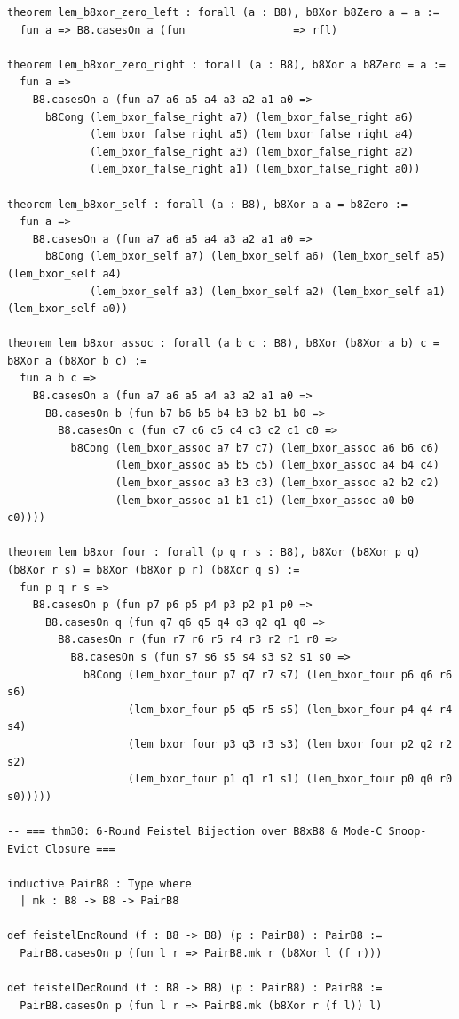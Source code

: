 \documentclass[10pt,twocolumn]{article}
\theoremstyle{spectralthm}
\begin{document}
\begin{lstlisting}[language=Lean4,caption={Standalone Pure Init.Prelude Term-Mode Lean 4 Expansion (thm30--thm37, v1.1.0, 0 sorry, 0 axioms).},label={lst:lean_v110}]
theorem lem_b8xor_zero_left : forall (a : B8), b8Xor b8Zero a = a :=
  fun a => B8.casesOn a (fun _ _ _ _ _ _ _ _ => rfl)

theorem lem_b8xor_zero_right : forall (a : B8), b8Xor a b8Zero = a :=
  fun a =>
    B8.casesOn a (fun a7 a6 a5 a4 a3 a2 a1 a0 =>
      b8Cong (lem_bxor_false_right a7) (lem_bxor_false_right a6)
             (lem_bxor_false_right a5) (lem_bxor_false_right a4)
             (lem_bxor_false_right a3) (lem_bxor_false_right a2)
             (lem_bxor_false_right a1) (lem_bxor_false_right a0))

theorem lem_b8xor_self : forall (a : B8), b8Xor a a = b8Zero :=
  fun a =>
    B8.casesOn a (fun a7 a6 a5 a4 a3 a2 a1 a0 =>
      b8Cong (lem_bxor_self a7) (lem_bxor_self a6) (lem_bxor_self a5) (lem_bxor_self a4)
             (lem_bxor_self a3) (lem_bxor_self a2) (lem_bxor_self a1) (lem_bxor_self a0))

theorem lem_b8xor_assoc : forall (a b c : B8), b8Xor (b8Xor a b) c = b8Xor a (b8Xor b c) :=
  fun a b c =>
    B8.casesOn a (fun a7 a6 a5 a4 a3 a2 a1 a0 =>
      B8.casesOn b (fun b7 b6 b5 b4 b3 b2 b1 b0 =>
        B8.casesOn c (fun c7 c6 c5 c4 c3 c2 c1 c0 =>
          b8Cong (lem_bxor_assoc a7 b7 c7) (lem_bxor_assoc a6 b6 c6)
                 (lem_bxor_assoc a5 b5 c5) (lem_bxor_assoc a4 b4 c4)
                 (lem_bxor_assoc a3 b3 c3) (lem_bxor_assoc a2 b2 c2)
                 (lem_bxor_assoc a1 b1 c1) (lem_bxor_assoc a0 b0 c0))))

theorem lem_b8xor_four : forall (p q r s : B8), b8Xor (b8Xor p q) (b8Xor r s) = b8Xor (b8Xor p r) (b8Xor q s) :=
  fun p q r s =>
    B8.casesOn p (fun p7 p6 p5 p4 p3 p2 p1 p0 =>
      B8.casesOn q (fun q7 q6 q5 q4 q3 q2 q1 q0 =>
        B8.casesOn r (fun r7 r6 r5 r4 r3 r2 r1 r0 =>
          B8.casesOn s (fun s7 s6 s5 s4 s3 s2 s1 s0 =>
            b8Cong (lem_bxor_four p7 q7 r7 s7) (lem_bxor_four p6 q6 r6 s6)
                   (lem_bxor_four p5 q5 r5 s5) (lem_bxor_four p4 q4 r4 s4)
                   (lem_bxor_four p3 q3 r3 s3) (lem_bxor_four p2 q2 r2 s2)
                   (lem_bxor_four p1 q1 r1 s1) (lem_bxor_four p0 q0 r0 s0)))))

-- === thm30: 6-Round Feistel Bijection over B8xB8 & Mode-C Snoop-Evict Closure ===

inductive PairB8 : Type where
  | mk : B8 -> B8 -> PairB8

def feistelEncRound (f : B8 -> B8) (p : PairB8) : PairB8 :=
  PairB8.casesOn p (fun l r => PairB8.mk r (b8Xor l (f r)))

def feistelDecRound (f : B8 -> B8) (p : PairB8) : PairB8 :=
  PairB8.casesOn p (fun l r => PairB8.mk (b8Xor r (f l)) l)


\end{lstlisting}
\end{document}
